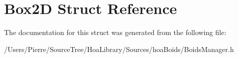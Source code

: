 \hypertarget{struct_box2_d}{\section{Box2\-D Struct Reference}
\label{struct_box2_d}
}


The documentation for this struct was generated from the following file\-:\begin{DoxyCompactItemize}
\item 
/\-Users/\-Pierre/\-Source\-Tree/\-Hoa\-Library/\-Sources/hoa\-Boids/Boids\-Manager.\-h\end{DoxyCompactItemize}
